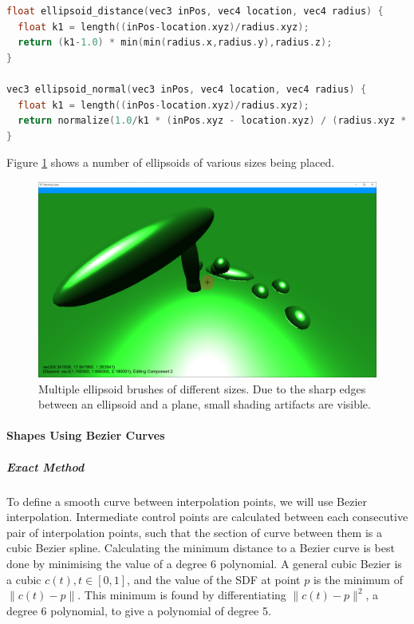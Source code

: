 \documentclass[11pt]{article}
\begin{document}
\begin{lstlisting}[language=C++,label={ellipsoid_sdf},caption={Approximate SDF and normal function for an ellipsoid.}]
float ellipsoid_distance(vec3 inPos, vec4 location, vec4 radius) {
  float k1 = length((inPos-location.xyz)/radius.xyz);
  return (k1-1.0) * min(min(radius.x,radius.y),radius.z);
}

vec3 ellipsoid_normal(vec3 inPos, vec4 location, vec4 radius) {
  float k1 = length((inPos-location.xyz)/radius.xyz);
  return normalize(1.0/k1 * (inPos.xyz - location.xyz) / (radius.xyz * radius.xyz));
}
\end{lstlisting}
Figure \ref{fig:editing_ellipsoids} shows a number of ellipsoids of various sizes being placed.
\begin{figure}[H]
  \includegraphics[width=\textwidth]{editing_ellipsoids}
  \caption{Multiple ellipsoid brushes of different sizes. Due to the sharp edges between an ellipsoid and a plane, small shading artifacts are visible.}
  \label{fig:editing_ellipsoids}
\end{figure}

\paragraph{Shapes Using Bezier Curves}
\subparagraph{Exact Method} %
To define a smooth curve between interpolation points, we will use Bezier interpolation. Intermediate control points are calculated between each consecutive pair of interpolation points, such that the section of curve between them is a cubic Bezier spline. Calculating the minimum distance to a Bezier curve is best done by minimising the value of a degree 6 polynomial. A general cubic Bezier is a cubic $c\left(t\right), t \in \left[0,1\right]$, and the value of the SDF at point $p$ is the minimum of $\| c\left(t\right) -p\|$. This minimum is found by differentiating $\| c\left(t\right) -p\|^2$, a degree 6 polynomial, to give a polynomial of degree 5.
\end{document}
